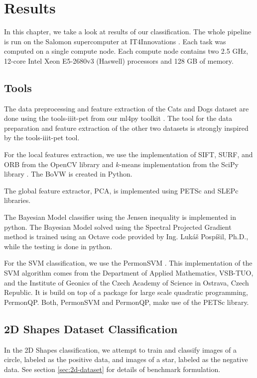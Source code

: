 \chapter{Results}\label{sec:results}
In this chapter, we take a look at results of our classification. The whole pipeline is run on the Salomon supercomputer at IT4Innovations \cite{Salomon-WWW-17}. Each task was computed on a single compute node. Each compute node contains two 2.5 GHz, 12-core Intel Xeon E5-2680v3 (Haswell) processors and 128 GB of memory.

\section{Tools}
The data preprocessing and feature extraction of the Cats and Dogs dataset are done using the tools-iiit-pet from our ml4py toolkit \cite{tools_iiit}. The tool for the data preparation and feature extraction of the other two datasets is strongly inspired by the tools-iiit-pet tool.

For the local features extraction, we use the implementation of SIFT, SURF, and ORB from the OpenCV library \cite{opencv} and $k$-means implementation from the SciPy library \cite{scipy}. The BoVW is created in Python.

The global feature extractor, PCA, is implemented using PETSc \cite{petsc} and SLEPc \cite{slepc} libraries.

The Bayesian Model classifier using the Jensen inequality is implemented in python. The Bayesian Model solved using the Spectral Projected Gradient method is trained using an Octave code provided by Ing. Lukáš Pospíšil, Ph.D., while the testing is done in python.

For the SVM classification, we use the PermonSVM \cite{permonSVM}. This implementation of the SVM algorithm comes from the Department of Applied Mathematics, VSB-TUO, and the Institute of Geonics of the Czech Academy of Science in Ostrava, Czech Republic. It is build on top of a package for large scale quadratic programming, PermonQP. Both, PermonSVM and PermonQP, make use of the PETSc \cite{petsc} library.

\section{2D Shapes Dataset Classification}
In the 2D Shapes classification, we attempt to train and classify images of a circle, labeled as the positive data, and images of a star, labeled as the negative data. See section \ref{sec:2d-dataset} for details of benchmark formulation.

